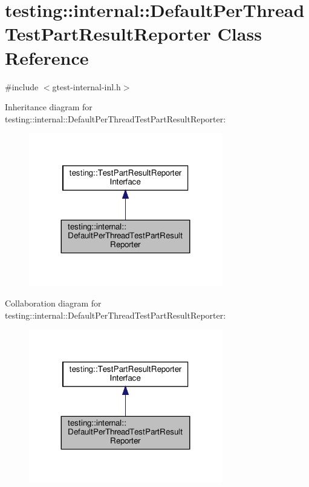 \hypertarget{classtesting_1_1internal_1_1_default_per_thread_test_part_result_reporter}{}\section{testing\+:\+:internal\+:\+:Default\+Per\+Thread\+Test\+Part\+Result\+Reporter Class Reference}
\label{classtesting_1_1internal_1_1_default_per_thread_test_part_result_reporter}


{\ttfamily \#include $<$gtest-\/internal-\/inl.\+h$>$}



Inheritance diagram for testing\+:\+:internal\+:\+:Default\+Per\+Thread\+Test\+Part\+Result\+Reporter\+:
\nopagebreak
\begin{figure}[H]
\begin{center}
\leavevmode
\includegraphics[width=239pt]{classtesting_1_1internal_1_1_default_per_thread_test_part_result_reporter__inherit__graph}
\end{center}
\end{figure}


Collaboration diagram for testing\+:\+:internal\+:\+:Default\+Per\+Thread\+Test\+Part\+Result\+Reporter\+:
\nopagebreak
\begin{figure}[H]
\begin{center}
\leavevmode
\includegraphics[width=239pt]{classtesting_1_1internal_1_1_default_per_thread_test_part_result_reporter__coll__graph}
\end{center}
\end{figure}
